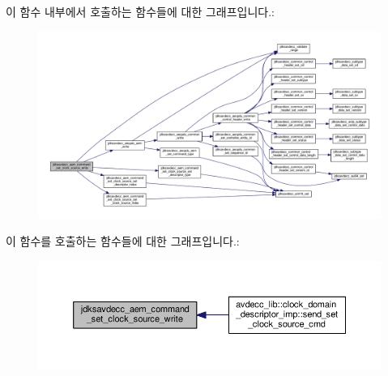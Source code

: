 이 함수 내부에서 호출하는 함수들에 대한 그래프입니다.\+:
\nopagebreak
\begin{figure}[H]
\begin{center}
\leavevmode
\includegraphics[width=350pt]{group__command__set__clock__source_ga6a1288efbaa6e519b04f94dfa3604763_cgraph}
\end{center}
\end{figure}




이 함수를 호출하는 함수들에 대한 그래프입니다.\+:
\nopagebreak
\begin{figure}[H]
\begin{center}
\leavevmode
\includegraphics[width=350pt]{group__command__set__clock__source_ga6a1288efbaa6e519b04f94dfa3604763_icgraph}
\end{center}
\end{figure}


